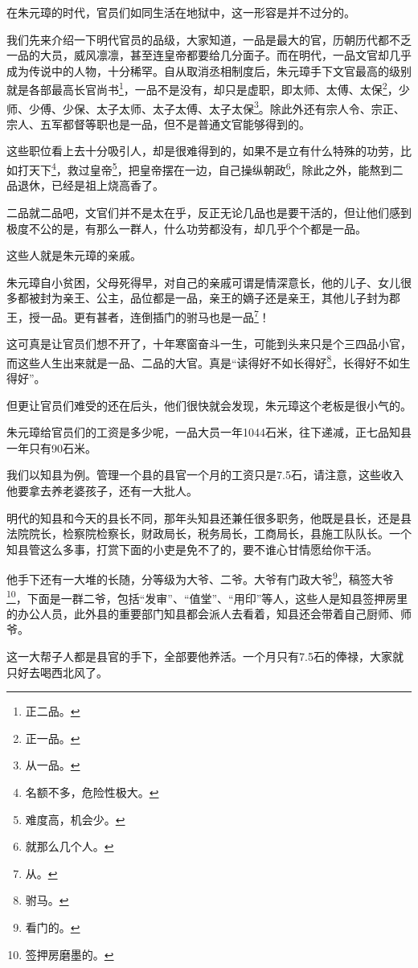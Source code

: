 \begin{multicols}{\theparacolNo}
		在朱元璋的时代，官员们如同生活在地狱中，这一形容是并不过分的。

		我们先来介绍一下明代官员的品级，大家知道，一品是最大的官，历朝历代都不乏一品的大员，威风凛凛，甚至连皇帝都要给几分面子。而在明代，一品文官却几乎成为传说中的人物，十分稀罕。自从取消丞相制度后，朱元璋手下文官最高的级别就是各部最高长官尚书\footnote{正二品。}，一品不是没有，却只是虚职，即太师、太傅、太保\footnote{正一品。}，少师、少傅、少保、太子太师、太子太傅、太子太保\footnote{从一品。}。除此外还有宗人令、宗正、宗人、五军都督等职也是一品，但不是普通文官能够得到的。

		这些职位看上去十分吸引人，却是很难得到的，如果不是立有什么特殊的功劳，比如打天下\footnote{名额不多，危险性极大。}，救过皇帝\footnote{难度高，机会少。}，把皇帝摆在一边，自己操纵朝政\footnote{就那么几个人。}，除此之外，能熬到二品退休，已经是祖上烧高香了。

		二品就二品吧，文官们并不是太在乎，反正无论几品也是要干活的，但让他们感到极度不公的是，有那么一群人，什么功劳都没有，却几乎个个都是一品。

		这些人就是朱元璋的亲戚。

		朱元璋自小贫困，父母死得早，对自己的亲戚可谓是情深意长，他的儿子、女儿很多都被封为亲王、公主，品位都是一品，亲王的嫡子还是亲王，其他儿子封为郡王，授一品。更有甚者，连倒插门的驸马也是一品\footnote{从。}！

		这可真是让官员们想不开了，十年寒窗奋斗一生，可能到头来只是个三四品小官，而这些人生出来就是一品、二品的大官。真是“读得好不如长得好\footnote{驸马。}，长得好不如生得好”。

		但更让官员们难受的还在后头，他们很快就会发现，朱元璋这个老板是很小气的。

		朱元璋给官员们的工资是多少呢，一品大员一年1044石米，往下递减，正七品知县一年只有90石米。

		我们以知县为例。管理一个县的县官一个月的工资只是7.5石，请注意，这些收入他要拿去养老婆孩子，还有一大批人。

		明代的知县和今天的县长不同，那年头知县还兼任很多职务，他既是县长，还是县法院院长，检察院检察长，财政局长，税务局长，工商局长，县施工队队长。一个知县管这么多事，打赏下面的小吏是免不了的，要不谁心甘情愿给你干活。

		他手下还有一大堆的长随，分等级为大爷、二爷。大爷有门政大爷\footnote{看门的。}，稿签大爷\footnote{签押房磨墨的。}，下面是一群二爷，包括“发审”、“值堂”、“用印”等人，这些人是知县签押房里的办公人员，此外县的重要部门知县都会派人去看着，知县还会带着自己厨师、师爷。

		这一大帮子人都是县官的手下，全部要他养活。一个月只有7.5石的俸禄，大家就只好去喝西北风了。


\end{multicols}
